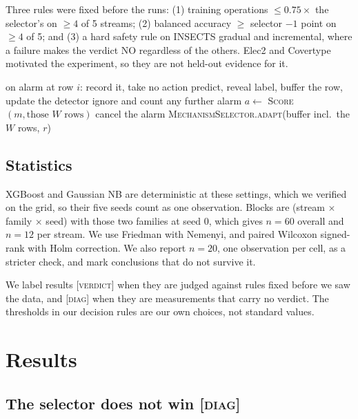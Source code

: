 \documentclass[conference]{IEEEtran}
\begin{document}
Three rules were fixed before the runs: (1) training operations
$\leq 0.75\times$ the selector's on $\geq 4$ of 5 streams; (2) balanced accuracy
$\geq$ selector $-1$ point on $\geq 4$ of 5; and (3) a hard safety rule on
INSECTS gradual and incremental, where a failure makes the verdict NO regardless
of the others. Elec2 and Covertype motivated the experiment, so they are not
held-out evidence for it.

\begin{algorithm}[t]
\caption{\textsc{WaitAndCheck}$(W)$ around the selector}
\label{alg:wac}
\small
\begin{algorithmic}[1]
\State on alarm at row $i$: record it, take no action
  \State predict, reveal label, buffer the row, update the detector
  \State ignore and count any further alarm
\EndFor
\State $a \gets$ \textsc{Score}$(m,\text{those } W \text{ rows})$ 
 
  \State cancel the alarm 
\Else
  \State \Return \textsc{MechanismSelector.adapt}(buffer incl.\ the $W$ rows, $r$)
\EndIf
\end{algorithmic}
\end{algorithm}

\subsection{Statistics}

XGBoost and Gaussian NB are deterministic at these settings, which we verified on
the grid, so their five seeds count as one observation. Blocks are
(stream $\times$ family $\times$ seed) with those two families at seed 0, which
gives $n=60$ overall and $n=12$ per stream. We use Friedman with Nemenyi, and
paired Wilcoxon signed-rank with Holm correction. We also report $n=20$, one
observation per cell, as a stricter check, and mark conclusions that do not
survive it.

We label results \textsc{[verdict]} when they are judged against rules fixed
before we saw the data, and \textsc{[diag]} when they are measurements that carry
no verdict. The thresholds in our decision rules are our own choices, not
standard values.

\section{Results}


\subsection{The selector does not win \textsc{[diag]}}
\end{document}

